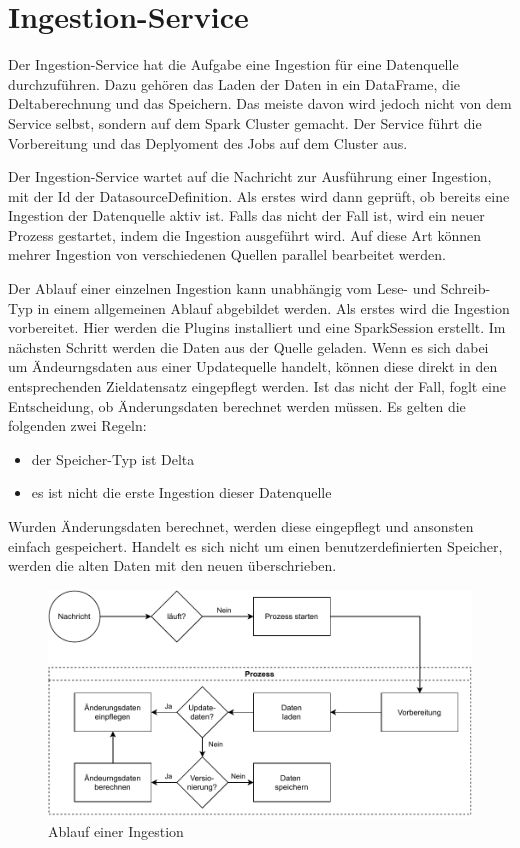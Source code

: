 \section{Ingestion-Service}
\label{sec:entw-ingestion}

Der Ingestion-Service hat die Aufgabe eine Ingestion für eine Datenquelle durchzuführen.
Dazu gehören das Laden der Daten in ein DataFrame, die Deltaberechnung und das Speichern.
Das meiste davon wird jedoch nicht von dem Service selbst, sondern auf dem Spark Cluster gemacht.
Der Service führt die Vorbereitung und das Deplyoment des Jobs auf dem Cluster aus.

Der Ingestion-Service wartet auf die Nachricht zur Ausführung einer Ingestion, mit der Id der DatasourceDefinition.
Als erstes wird dann geprüft, ob bereits eine Ingestion der Datenquelle aktiv ist.
Falls das nicht der Fall ist, wird ein neuer Prozess gestartet, indem die Ingestion ausgeführt wird.
Auf diese Art können mehrer Ingestion von verschiedenen Quellen parallel bearbeitet werden.

Der Ablauf einer einzelnen Ingestion kann unabhängig vom Lese- und Schreib-Typ in einem allgemeinen Ablauf abgebildet werden.
Als erstes wird die Ingestion vorbereitet.
Hier werden die Plugins installiert und eine SparkSession erstellt.
Im nächsten Schritt werden die Daten aus der Quelle geladen.
Wenn es sich dabei um Ändeurngsdaten aus einer Updatequelle handelt, können diese direkt in den entsprechenden Zieldatensatz eingepflegt werden.
Ist das nicht der Fall, foglt eine Entscheidung, ob Änderungsdaten berechnet werden müssen.
Es gelten die folgenden zwei Regeln: \begin{itemize}
    \item der Speicher-Typ ist Delta
    \item es ist nicht die erste Ingestion dieser Datenquelle
\end{itemize}
Wurden Änderungsdaten berechnet, werden diese eingepflegt und ansonsten einfach gespeichert.
Handelt es sich nicht um einen benutzerdefinierten Speicher, werden die alten Daten mit den neuen überschrieben.

\begin{figure}
    \centering
    \includegraphics[width=\textwidth]{Grafiken/Entwicklung-Ingestion-Ablauf.pdf}
    \caption{Ablauf einer Ingestion}
    \label{fig:ingestion-ablauf}
\end{figure}